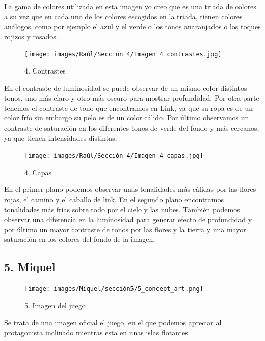 \documentclass[12pt]{article}
\begin{document}
La gama de colores utilizada en esta imagen yo creo que es una triada de colores a su vez que en cada uno de los colores escogidos en la triada, tienen colores análogos, como por ejemplo el azul y el verde o los tonos anaranjados o los toques rojizos y rosados.

\begin{figure}[H]
      \centering
      \texttt{[image: images/Raúl/Sección 4/Imagen 4 contrastes.jpg]}
      \caption{\small 4. Contrastes}
\end{figure}

En el contraste de luminosidad se puede observar de un mismo color distintos tonos, uno más claro y otro más oscuro para mostrar profundidad. Por otra parte tenemos el contraste de tono que encontramos en Link, ya que su ropa es de un color frío sin embargo su pelo es de un color cálido. Por último observamos un contraste de saturación en los diferentes tonos de verde del fondo y más cercanos, ya que tienen intensidades distintas.

\begin{figure}[H]
      \centering
      \texttt{[image: images/Raúl/Sección 4/Imagen 4 capas.jpg]}
      \caption{\small 4. Capas}
\end{figure}

 En el primer plano podemos observar unas tonalidades más cálidas por las flores rojas, el camino y el caballo de link. En el segundo plano encontramos tonalidades más frías sobre todo por el cielo y las nubes. También podemos observar una diferencia en la luminosidad para generar efecto de profundidad y por último un mayor contraste de tonos por las flores y la tierra y una mayor saturación en los colores del fondo de la imagen.


        \newpage


    \subsection{5. Miquel}
        \begin{figure}[H]
      \centering
      \texttt{[image: images/Miquel/sección5/5\_concept\_art.png]}
      \caption{\small 5. Imagen del juego}
    \end{figure}

    Se trata de una imagen oficial el juego, en el que podemos apreciar al protagonista inclinado mientras esta en unas islas flotantes
\end{document}
